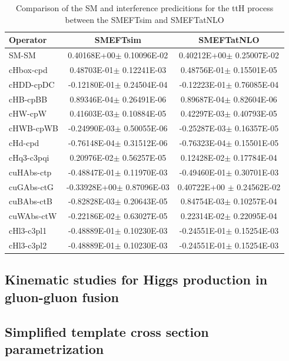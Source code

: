 \begin{table}[h]
\begin{tabular}{|l|c|c|}
\hline
\textbf{Operator} & \textbf{SMEFTsim} & \textbf{SMEFTatNLO} \\
 \hline
 SM-SM & 0.40168E+00$\pm$ 0.10096E-02& 0.40212E+00$\pm$ 0.25007E-02\\
 \hline
 cHbox-cpd & 0.48703E-01$\pm$ 0.12241E-03& 0.48756E-01$\pm$ 0.15501E-05\\
 \hline
 cHDD-cpDC & -0.12180E-01$\pm$ 0.24504E-04& -0.12223E-01$\pm$ 0.76085E-04\\
 \hline
 cHB-cpBB & 0.89346E-04$\pm$ 0.26491E-06& 0.89687E-04$\pm$ 0.82604E-06\\
 \hline
 cHW-cpW & 0.41603E-03$\pm$ 0.10884E-05& 0.42297E-03$\pm$ 0.40793E-05\\
 \hline
 cHWB-cpWB & -0.24990E-03$\pm$ 0.50055E-06& -0.25287E-03$\pm$ 0.16357E-05\\
 \hline
 cHd-cpd & -0.76148E-04$\pm$ 0.31512E-06& -0.76323E-04$\pm$ 0.15501E-05\\
 \hline
 cHq3-c3pqi & 0.20976E-02$\pm$ 0.56257E-05& 0.12428E-02$\pm$ 0.17784E-04\\
 \hline
 cuHAbs-ctp & -0.48847E-01$\pm$ 0.11970E-03& -0.49460E-01$\pm$ 0.30701E-03\\
 \hline
 cuGAbs-ctG & -0.33928E+00$\pm$ 0.87096E-03& 0.40722E+00 $\pm$ 0.24562E-02\\
 \hline
 cuBAbs-ctB & -0.82828E-03$\pm$ 0.20643E-05& 0.84754E-03$\pm$ 0.10257E-04\\
 \hline
 cuWAbs-ctW & -0.22186E-02$\pm$ 0.63027E-05& 0.22314E-02$\pm$ 0.22095E-04\\
  \hline
 cHl3-c3pl1 & -0.48889E-01$\pm$ 0.10230E-03& -0.24551E-01$\pm$ 0.15254E-03\\
 cHl3-c3pl2 & -0.48889E-01$\pm$ 0.10230E-03& -0.24551E-01$\pm$ 0.15254E-03\\
 \hline
  \end{tabular}
\caption{ Comparison of the SM and interference predicitions for the ttH process between the SMEFTsim and SMEFTatNLO}
\end{table}



\subsection{Kinematic studies for Higgs production in gluon-gluon fusion}
\label{sec:higgseft:section3}


\subsection{Simplified template cross section parametrization}
\label{sec:higgseft:section3}







